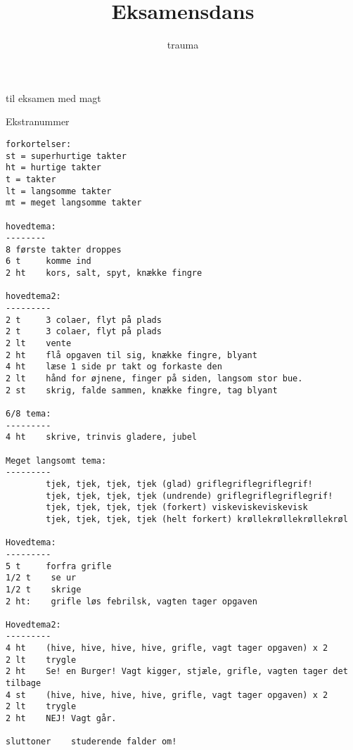 \documentclass[danish]{article}
\title{Eksamensdans}
\author{trauma}
\begin{document}
\maketitle

\begin{roles}
   til eksamen
   med magt
\end{roles}

\begin{sketch}

\scene Ekstranummer

\begin{verbatim}
forkortelser:
st = superhurtige takter
ht = hurtige takter
t = takter
lt = langsomme takter
mt = meget langsomme takter

hovedtema:
--------
8 første takter droppes
6 t     komme ind
2 ht    kors, salt, spyt, knække fingre

hovedtema2:
---------
2 t     3 colaer, flyt på plads
2 t     3 colaer, flyt på plads
2 lt    vente
2 ht    flå opgaven til sig, knække fingre, blyant
4 ht    læse 1 side pr takt og forkaste den
2 lt    hånd for øjnene, finger på siden, langsom stor bue.
2 st    skrig, falde sammen, knække fingre, tag blyant

6/8 tema:
---------
4 ht    skrive, trinvis gladere, jubel

Meget langsomt tema:
---------
        tjek, tjek, tjek, tjek (glad) griflegriflegriflegrif!
        tjek, tjek, tjek, tjek (undrende) griflegriflegriflegrif!
        tjek, tjek, tjek, tjek (forkert) viskeviskeviskevisk
        tjek, tjek, tjek, tjek (helt forkert) krøllekrøllekrøllekrøl

Hovedtema:
---------
5 t     forfra grifle
1/2 t    se ur
1/2 t    skrige
2 ht:    grifle løs febrilsk, vagten tager opgaven

Hovedtema2:
---------
4 ht    (hive, hive, hive, hive, grifle, vagt tager opgaven) x 2
2 lt    trygle
2 ht    Se! en Burger! Vagt kigger, stjæle, grifle, vagten tager det tilbage
4 st    (hive, hive, hive, hive, grifle, vagt tager opgaven) x 2
2 lt    trygle
2 ht    NEJ! Vagt går.

sluttoner    studerende falder om!
\end{verbatim}

\end{sketch}
\end{document}
